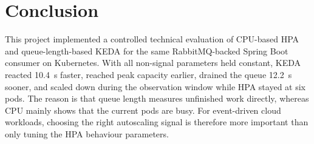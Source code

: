 \section{Conclusion}
\label{sec:conclusion}

This project implemented a controlled technical evaluation of CPU-based HPA and queue-length-based KEDA for the same RabbitMQ-backed Spring Boot consumer on Kubernetes. With all non-signal parameters held constant, KEDA reacted 10.4~s faster, reached peak capacity earlier, drained the queue 12.2~s sooner, and scaled down during the observation window while HPA stayed at six pods. The reason is that queue length measures unfinished work directly, whereas CPU mainly shows that the current pods are busy. For event-driven cloud workloads, choosing the right autoscaling signal is therefore more important than only tuning the HPA behaviour parameters.
